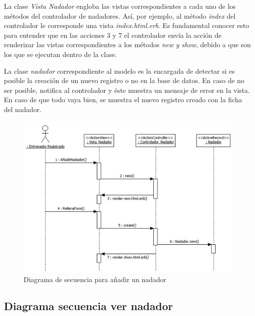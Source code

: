 			La clase {\it Vista Nadador} engloba las vistas correspondientes a cada uno de los métodos del controlador de nadadores. Así, por ejemplo, al método {\it index} del controlador le corresponde una vista {\it index.html.erb}. Es fundamental conocer esto para entender que en las acciones 3 y 7 el controlador envía la acción de renderizar las vistas correspondientes a los métodos {\it new y show}, debido a que son los que se ejecutan dentro de la clase.
			
			La clase {\it nadador} correspondiente al modelo es la encargada de detectar si es posible la creación de un nuevo registro o no en la base de datos. En caso de no ser posible, notifica al controlador y éste muestra un mensaje de error en la vista. En caso de que todo vaya bien, se muestra el nuevo registro creado con la ficha del nadador.
			
			\begin{figure}[H]
			  \centering
			    \includegraphics[width=15cm]{./eps/di_diagsecuencia/Nadador_Anadir.eps}
			  \caption{Diagrama de secuencia para añadir un nadador}
			  \label{fig:di_sec_anadirnadador}
			\end{figure}
			
		
		\subsection{Diagrama secuencia ver nadador} %
		\label{sub:diagrama_secuencia_ver_nadador}
		
